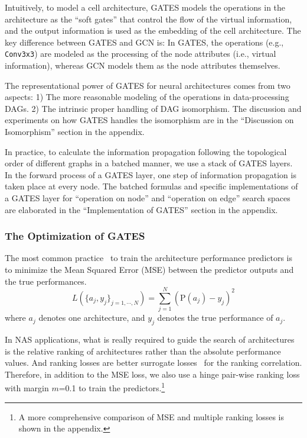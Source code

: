 \documentclass[runningheads]{llncs}
\begin{document}
Intuitively, to model a cell architecture, GATES models the operations in the architecture as the ``soft gates'' that control the flow of the virtual information, and the output information is used as the embedding of the cell architecture. 
The key difference between GATES and GCN is: In GATES, the operations (e.g., \texttt{Conv3x3}) are modeled as the processing of the node attributes (i.e., virtual information), whereas GCN models them as the node attributes themselves.


The representational power of GATES for neural architectures comes from two aspects: 1)
The more reasonable modeling of the operations in data-processing DAGs. 2) The intrinsic proper handling of DAG isomorphism. 
The discussion and experiments on how GATES handles the isomorphism are in the ``Discussion on Isomorphism'' section in the appendix.



In practice, to calculate the information propagation following the topological order of different graphs in a batched manner, we use a stack of GATES layers. In the forward process of a GATES layer, one step of information propagation is taken place at every node. 
The batched formulas and specific implementations of a GATES layer for ``operation on node'' and ``operation on edge'' search spaces are elaborated in the ``Implementation of GATES'' section in the appendix.

\subsubsection{The Optimization of GATES}


The most common practice~\cite{liu2018progressive,nao2018} to train the architecture performance predictors is to minimize the Mean Squared Error (MSE) between the predictor outputs and the true performances.
\begin{equation}
  L(\{a_j, y_j\}_{j=1,\cdots,N}) = \sum_{j=1}^N(\mbox{P}(a_j) - y_j)^2
\end{equation}
where $a_j$ denotes one architecture, and $y_j$ denotes the true performance of $a_j$.


In NAS applications, what is really required to guide the search of architectures is the relative ranking of architectures rather than the absolute performance values. And ranking losses are better surrogate losses~\cite{chen2009,liu2009learning,xu2019renas} for the ranking correlation. 
Therefore, in addition to the MSE loss, we also use a hinge pair-wise ranking loss with margin $m$=0.1 to train the predictors.\footnote{A more comprehensive comparison of MSE and multiple ranking losses is shown in the appendix.}
\end{document}
